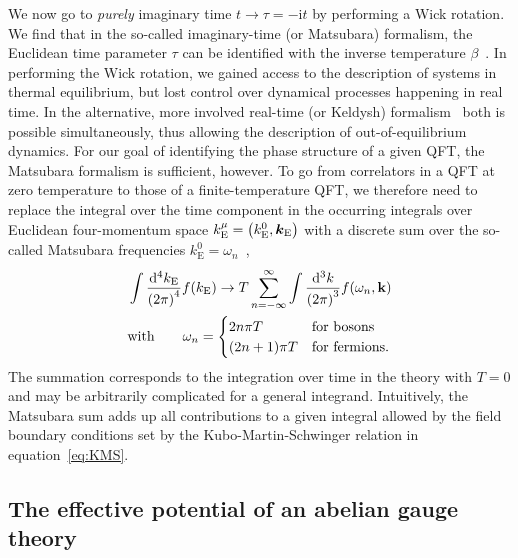 We now go to \textit{purely} imaginary time $t \rightarrow \tau = - \mathrm{i} t$ by performing a Wick rotation. We find that in the so-called imaginary-time (or Matsubara) formalism, the Euclidean time parameter $\tau$ can be identified with the inverse temperature $\beta$~\cite{Matsubara:1955ws}. In performing the Wick rotation, we gained access to the description of systems in thermal equilibrium, but lost control over dynamical processes happening in real time. In the alternative, more involved real-time (or Keldysh)  formalism~\cite{Keldysh:1964ud} both is possible simultaneously, thus allowing the description of out-of-equilibrium dynamics. For our goal of identifying the phase structure of a given \ac{QFT}, the Matsubara formalism is sufficient, however. To  go from correlators in a \ac{QFT} at zero temperature to those of a finite-temperature \ac{QFT}, we therefore need to replace the integral over the time component in the occurring integrals over Euclidean four-momentum space $k_\text{E}^\mu = \left( k_\text{E}^0, \bm{k}_\text{E} \right)$ with a discrete sum over the so-called Matsubara frequencies $k_\text{E}^0 = \omega_n$~\cite{Quiros:1999jp},
\begin{align}
	&\int \frac{\mathop{}\!\mathrm{d}^4 k_\text{E}}{\left( 2 \pi \right)^4} f(k_\text{E}) \rightarrow T \sum_{n = - \infty}^\infty \int \frac{\mathop{}\!\mathrm{d}^3 k}{\left( 2 \pi \right)^3} f(\omega_n, \mathbf{k})
	\label{eq:TFT} \nonumber \\ 
	&\text{with} \qquad \omega_n = \begin{cases}
		2n \pi T &\text{for bosons}\\
		(2n + 1) \pi T &\text{for fermions} .
	\end{cases} 
\end{align}
The summation corresponds to the integration over time in the theory with $T=0$ and may be arbitrarily complicated for a general integrand. Intuitively, the Matsubara sum adds up all contributions to a given integral allowed by the field boundary conditions set by the Kubo-Martin-Schwinger relation in equation~\eqref{eq:KMS}. 


\subsection{The effective potential of an abelian gauge theory}
\label{sec:VeffU1}

